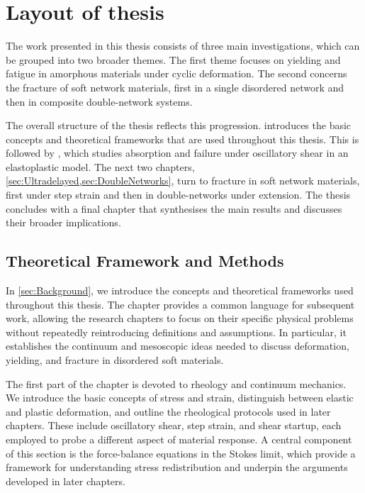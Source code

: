 \documentclass[asymmetricmargins]{library/duthesis}%
\begin{document}
\newpage
\section{Layout of thesis}

The work presented in this thesis consists of three main investigations, which can be grouped into two broader themes. The first theme focuses on yielding and fatigue in amorphous materials under cyclic deformation. The second concerns the fracture of soft network materials, first in a single disordered network and then in composite double-network systems. 

The overall structure of the thesis reflects this progression.  introduces the basic concepts and theoretical frameworks that are used throughout this thesis. This is followed by , which studies absorption and failure under oscillatory shear in an elastoplastic model. The next two chapters, \cref{sec:Ultradelayed,sec:DoubleNetworks}, turn to fracture in soft network materials, first under step strain and then in double-networks under extension. The thesis concludes with a final chapter that synthesises the main results and discusses their broader implications.

\subsection*{Theoretical Framework and Methods}
In \cref{sec:Background}, we introduce the concepts and theoretical frameworks used throughout this thesis. The chapter provides a common language for subsequent work, allowing the research chapters to focus on their specific physical problems without repeatedly reintroducing definitions and assumptions. In particular, it establishes the continuum and mesoscopic ideas needed to discuss deformation, yielding, and fracture in disordered soft materials.

The first part of the chapter is devoted to rheology and continuum mechanics. We introduce the basic concepts of stress and strain, distinguish between elastic and plastic deformation, and outline the rheological protocols used in later chapters. These include oscillatory shear, step strain, and shear startup, each employed to probe a different aspect of material response. A central component of this section is the force-balance equations in the Stokes limit, which provide a framework for understanding stress redistribution and underpin the arguments developed in later chapters.
\end{document}
